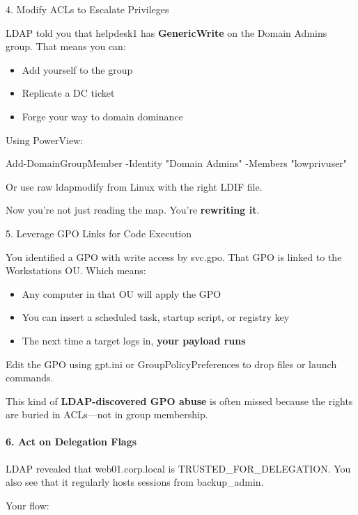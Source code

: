4. Modify ACLs to Escalate Privileges

LDAP told you that helpdesk1 has \textbf{GenericWrite} on the Domain Admins group. That means you can:

\begin{itemize}
    \item Add yourself to the group

    \item Replicate a DC ticket

    \item Forge your way to domain dominance

\end{itemize}
Using PowerView:
 
Add-DomainGroupMember -Identity "Domain Admins" -Members "lowprivuser"

Or use raw ldapmodify from Linux with the right LDIF file.

Now you're not just reading the map. You’re \textbf{rewriting it}.

5. Leverage GPO Links for Code Execution

You identified a GPO with write access by svc.gpo. That GPO is linked to the Workstations OU. Which means:

\begin{itemize}
    \item Any computer in that OU will apply the GPO

    \item You can insert a scheduled task, startup script, or registry key

    \item The next time a target logs in, \textbf{your payload runs}

\end{itemize}
Edit the GPO using gpt.ini or GroupPolicyPreferences to drop files or launch commands.

This kind of \textbf{LDAP-discovered GPO abuse} is often missed because the rights are buried in ACLs—not in group membership.

\paragraph{\textbf{   6. Act on Delegation Flags}}

LDAP revealed that web01.corp.local is TRUSTED\_FOR\_DELEGATION. You also see that it regularly hosts sessions from backup\_admin.

Your flow:

